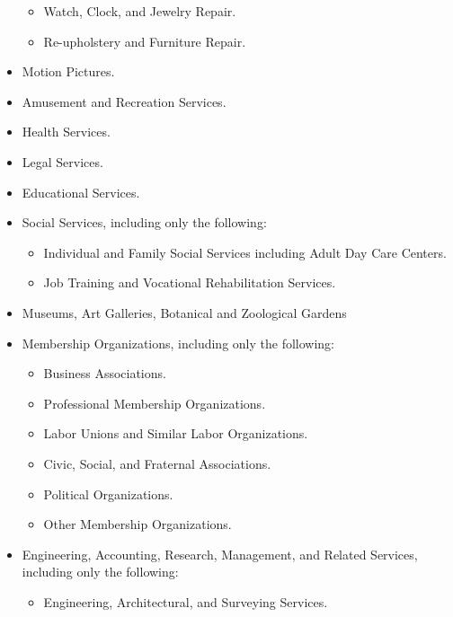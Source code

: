 \begin{itemize}
\begin{itemize}
\item Watch, Clock, and Jewelry Repair.

\item Re-upholstery and Furniture Repair.
\end{itemize}
\item Motion Pictures.

\item Amusement and Recreation Services.

\item Health Services.

\item Legal Services.

\item Educational Services.

\item Social Services, including only the following:
\begin{itemize}
\item Individual and Family Social Services including Adult Day Care Centers.

\item Job Training and Vocational Rehabilitation Services.
\end{itemize}
\item Museums, Art Galleries, Botanical and Zoological Gardens

\item Membership Organizations, including only the following:
\begin{itemize}
\item Business Associations.

\item Professional Membership Organizations.

\item Labor Unions and Similar Labor Organizations.

\item Civic, Social, and Fraternal Associations.

\item Political Organizations.

\item Other Membership Organizations.
\end{itemize}
\item Engineering, Accounting, Research, Management, and Related Services,
including only the following:
\begin{itemize}
\item Engineering, Architectural, and Surveying Services.


\end{itemize}
\end{itemize}
